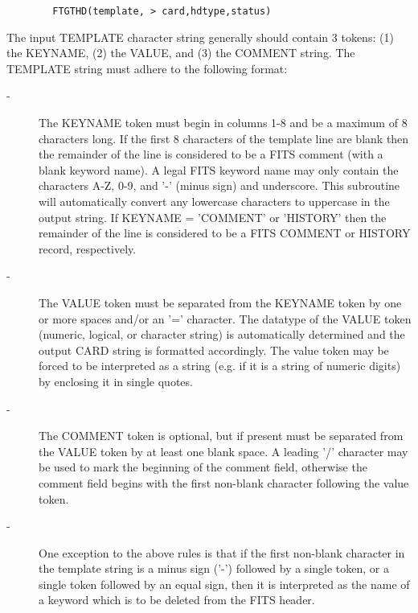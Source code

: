 \documentclass[11pt]{book}
\begin{document}
\begin{verbatim}
        FTGTHD(template, > card,hdtype,status)
\end{verbatim}
    The input TEMPLATE character string generally should contain 3 tokens:
    (1) the KEYNAME, (2) the VALUE, and (3) the COMMENT string.  The
    TEMPLATE string must adhere to the following format:


\begin{description}
\item[- ]     The KEYNAME token must begin in columns 1-8 and be a maximum  of 8
        characters long.  If the first 8 characters of the template line are
        blank then the remainder of the line is considered to be a FITS comment
        (with a blank keyword name).  A legal FITS keyword name may only
        contain the characters A-Z, 0-9, and '-' (minus sign) and
        underscore.  This subroutine will automatically convert any lowercase
        characters to uppercase in the output string.  If KEYNAME = 'COMMENT'
        or 'HISTORY' then the remainder of the line is considered to be a FITS
       COMMENT or HISTORY record, respectively.
\end{description}


\begin{description}
\item[- ]     The VALUE token must be separated from the KEYNAME token by one or more
        spaces and/or an '=' character.  The datatype of the VALUE token
        (numeric, logical, or character string) is automatically determined
        and  the output CARD string is formatted accordingly.  The value
        token may be forced to be interpreted as a string (e.g. if it is a
       string of numeric digits) by enclosing it in single quotes.
\end{description}


\begin{description}
\item[- ]     The COMMENT token is optional, but if present must be separated from
        the VALUE token by at least one blank space.  A leading '/' character
        may be used to mark the beginning of the comment field, otherwise the
        comment field begins with the first non-blank character following the
       value token.
\end{description}


\begin{description}
\item[- ]     One exception to the above rules is that if the first non-blank
        character in the template string is a minus sign ('-') followed
        by a single token, or a single token followed by an equal sign,
        then it is interpreted as the name of a keyword which is to be
       deleted from the FITS header.
\end{description}
\end{document}
